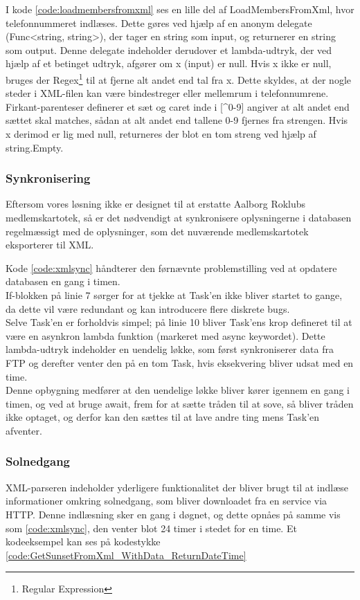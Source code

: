 
I kode \ref{code:loadmembersfromxml} ses en lille del af LoadMembersFromXml, hvor telefonnummeret indlæses. Dette gøres ved hjælp af en anonym delegate (Func<string, string>), der tager en string som input, og returnerer en string som output. Denne delegate indeholder derudover et lambda-udtryk, der ved hjælp af et betinget udtryk, afgører om x (input) er null. Hvis x ikke er null, bruges der Regex\footnote{Regular Expression} til at fjerne alt andet end tal fra x. Dette skyldes, at der nogle steder i XML-filen kan være bindestreger eller mellemrum i telefonnumrene. Firkant-parenteser definerer et sæt og caret inde i [\textasciicircum0-9] angiver at alt andet end sættet skal matches, sådan at alt andet end tallene 0-9 fjernes fra strengen. Hvis x derimod er lig med null, returneres der blot en tom streng ved hjælp af string.Empty.

\subsubsection*{Synkronisering}
Eftersom vores løsning ikke er designet til at erstatte Aalborg Roklubs medlemskartotek, så er det nødvendigt at synkronisere oplysningerne i databasen regelmæssigt med de oplysninger, som det nuværende medlemskartotek eksporterer til XML.\\


Kode \ref{code:xmlsync} håndterer den førnævnte problemstilling ved at opdatere databasen en gang i timen.\\
If-blokken på linie 7 sørger for at tjekke at Task'en ikke bliver startet to gange, da dette vil være redundant og kan introducere flere diskrete bugs.\\
Selve Task'en er forholdvis simpel; på linie 10 bliver Task'ens krop defineret til at være en asynkron lambda funktion (markeret med async keywordet). Dette lambda-udtryk indeholder en uendelig løkke, som først synkroniserer data fra FTP og derefter venter den på en tom Task, hvis eksekvering bliver udsat med en time.\\

Denne opbygning medfører at den uendelige løkke bliver kører igennem en gang i timen, og ved at bruge await, frem for at sætte tråden til at sove, så bliver tråden ikke optaget, og derfor kan den sættes til at lave andre ting mens Task'en afventer.

\subsubsection*{Solnedgang}
XML-parseren indeholder yderligere funktionalitet der bliver brugt til at indlæse informationer omkring solnedgang, som bliver downloadet fra en service via HTTP. Denne indlæsning sker en gang i døgnet, og dette opnåes på samme vis som \ref{code:xmlsync}, den venter blot 24 timer i stedet for en time. Et kodeeksempel kan ses på kodestykke \ref{code:GetSunsetFromXml_WithData_ReturnDateTime}